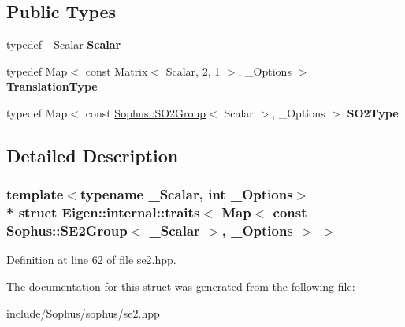 \subsection*{Public Types}
\begin{DoxyCompactItemize}
\item 
typedef \+\_\+\+Scalar {\bfseries Scalar}\hypertarget{struct_eigen_1_1internal_1_1traits_3_01_map_3_01const_01_sophus_1_1_s_e2_group_3_01___scalar_01_4_00_01___options_01_4_01_4_a196ce0a796f33f211b62a518d02bb2ad}{}\label{struct_eigen_1_1internal_1_1traits_3_01_map_3_01const_01_sophus_1_1_s_e2_group_3_01___scalar_01_4_00_01___options_01_4_01_4_a196ce0a796f33f211b62a518d02bb2ad}

\item 
typedef Map$<$ const Matrix$<$ Scalar, 2, 1 $>$, \+\_\+\+Options $>$ {\bfseries Translation\+Type}\hypertarget{struct_eigen_1_1internal_1_1traits_3_01_map_3_01const_01_sophus_1_1_s_e2_group_3_01___scalar_01_4_00_01___options_01_4_01_4_a89ec49a6ef16f42393fe25d22ce2fa43}{}\label{struct_eigen_1_1internal_1_1traits_3_01_map_3_01const_01_sophus_1_1_s_e2_group_3_01___scalar_01_4_00_01___options_01_4_01_4_a89ec49a6ef16f42393fe25d22ce2fa43}

\item 
typedef Map$<$ const \hyperlink{class_sophus_1_1_s_o2_group}{Sophus\+::\+S\+O2\+Group}$<$ Scalar $>$, \+\_\+\+Options $>$ {\bfseries S\+O2\+Type}\hypertarget{struct_eigen_1_1internal_1_1traits_3_01_map_3_01const_01_sophus_1_1_s_e2_group_3_01___scalar_01_4_00_01___options_01_4_01_4_a6712fbc007ed0d62e9bb115cba7e59aa}{}\label{struct_eigen_1_1internal_1_1traits_3_01_map_3_01const_01_sophus_1_1_s_e2_group_3_01___scalar_01_4_00_01___options_01_4_01_4_a6712fbc007ed0d62e9bb115cba7e59aa}

\end{DoxyCompactItemize}


\subsection{Detailed Description}
\subsubsection*{template$<$typename \+\_\+\+Scalar, int \+\_\+\+Options$>$\\*
struct Eigen\+::internal\+::traits$<$ Map$<$ const Sophus\+::\+S\+E2\+Group$<$ \+\_\+\+Scalar $>$, \+\_\+\+Options $>$ $>$}



Definition at line 62 of file se2.\+hpp.



The documentation for this struct was generated from the following file\+:\begin{DoxyCompactItemize}
\item 
include/\+Sophus/sophus/se2.\+hpp\end{DoxyCompactItemize}
